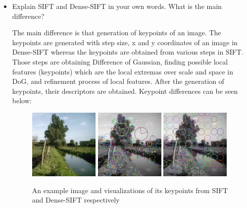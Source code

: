 \documentclass[12pt]{article}
\begin{document}
    \begin{itemize}
        \item Explain SIFT and Dense-SIFT in your own words. What is the main difference?
        
        The main difference is that generation of keypoints of an image. The keypoints are generated with step size, x and y coordinates of an image in Dense-SIFT whereas the keypoints are obtained from various steps in SIFT. Those steps are obtaining Difference of Gaussian, finding possible local features (keypoints) which are the local extremas over scale and space in DoG, and refinement process of local features. After the generation of keypoints, their descriptors are obtained. Keypoint differences can be seen below:
        
        \begin{figure}[h]
			\centering
			\includegraphics[width=0.32\textwidth]{example1.jpg}
			\includegraphics[width=0.32\textwidth]{example1_sift_keypoints.jpg}
			\includegraphics[width=0.32\textwidth]{example1_densesift_keypoints.jpg}
			\caption{An example image and visualizations of its keypoints from SIFT and Dense-SIFT respectively}
		\end{figure}
		

\end{itemize}
\end{document}

